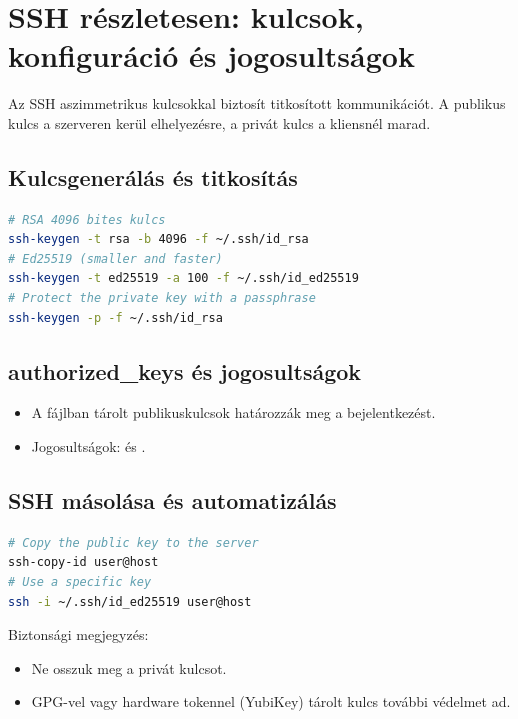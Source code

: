 \section{SSH részletesen: kulcsok, konfiguráció és jogosultságok}

Az SSH aszimmetrikus kulcsokkal biztosít titkosított kommunikációt. A publikus kulcs a szerveren kerül elhelyezésre, a privát kulcs a kliensnél marad.

\subsection{Kulcsgenerálás és titkosítás}
\begin{lstlisting}[language=bash]
# RSA 4096 bites kulcs
ssh-keygen -t rsa -b 4096 -f ~/.ssh/id_rsa
# Ed25519 (smaller and faster)
ssh-keygen -t ed25519 -a 100 -f ~/.ssh/id_ed25519
# Protect the private key with a passphrase
ssh-keygen -p -f ~/.ssh/id_rsa
\end{lstlisting}

\subsection{authorized\_keys és jogosultságok}
\begin{itemize}
  \item A  fájlban tárolt publikuskulcsok határozzák meg a bejelentkezést.
  \item Jogosultságok:  és .
\end{itemize}

\subsection{SSH másolása és automatizálás}
\begin{lstlisting}[language=bash]
# Copy the public key to the server
ssh-copy-id user@host
# Use a specific key
ssh -i ~/.ssh/id_ed25519 user@host
\end{lstlisting}

Biztonsági megjegyzés:
\begin{itemize}
  \item Ne osszuk meg a privát kulcsot.
  \item GPG-vel vagy hardware tokennel (YubiKey) tárolt kulcs további védelmet ad.
\end{itemize}

